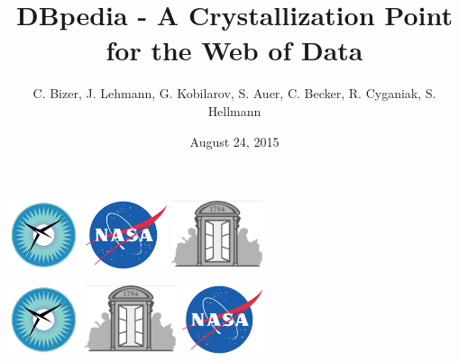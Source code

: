 \documentclass{beamer}
\title{DBpedia - A Crystallization Point for the Web of Data}
\author{C. Bizer, J. Lehmann, G. Kobilarov, S. Auer, C. Becker, R. Cyganiak, S. Hellmann}
\date{August 24, 2015}
\begin{document}
  	\begin{frame}
  		
  		\begin{center}
  			\includegraphics[height=2cm]{images/NIA-logo.jpg} \text{                     } \includegraphics[height=2cm]{images/NASA.png}
  			\includegraphics[height=2cm]{images/ENS-logo.jpg}
  		\end{center}
  		\titlepage
  	\end{frame}
  	
  	\begin{frame}
  		
  		\begin{center}
  			\includegraphics[height=2cm]{images/NIA-logo.jpg}
  			\includegraphics[height=2cm]{images/ENS logo.jpg} \includegraphics[height=2cm]{images/NASA.png}
  		\end{center}
  		\titlepage
  	\end{frame}
  	
\end{document}
